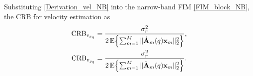 \documentclass[9pt,final,journal,twocolumn]{IEEEtran}
\newtheorem{remark}{Remark}
\begin{document}
Substituting \eqref{Derivation_vel_NB} into the narrow-band FIM \eqref{FIM_block_NB}, the CRB for velocity estimation as
\begin{subequations}\label{CRB_vel_q_NB}
\begin{align}
 \mathrm{CRB}_{v_{x_q}}
 &=\frac{\sigma_r^2}{2\,\mathbb{E}\!\left\{\sum_{m=1}^{M}\|\acute{\bf A}_{m}(q){\bf x}_{m}\|_2^2\right\}},\\
 \mathrm{CRB}_{v_{y_q}}
 &=\frac{\sigma_r^2}{2\,\mathbb{E}\!\left\{\sum_{m=1}^{M}\|\grave{\bf A}_{m}(q){\bf x}_{m}\|_2^2\right\}}.
\end{align}
\end{subequations}
%
\end{document}

